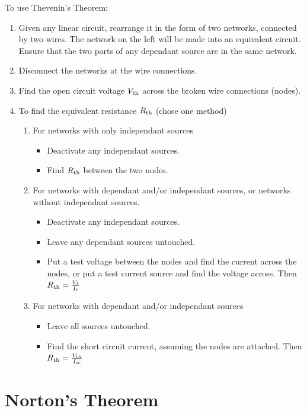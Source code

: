 \documentclass[12pt]{article}
\begin{document}
To use Thevenin's Theorem:
\begin{enumerate}
\item Given any linear circuit, rearrange it in the form of two networks, connected by two wires. The network on the left will be made into an equivalent circuit. Ensure that the two parts of any dependant source are in the same network.
\item Disconnect the networks at the wire connections.
\item Find the open circuit voltage $V_{{\rm th}}$ across the broken wire connections (nodes).
\item To find the equivalent resistance $R_{{\rm th}}$ (chose one method)
\begin{enumerate}
\item For networks with only independant sources
\begin{itemize}
\item Deactivate any independant sources.
\item Find $R_{{\rm th}}$ between the two nodes.
\end{itemize}
\item For networks with dependant and/or independant sources, or networks without independant sources.
\begin{itemize}
\item Deactivate any independant sources.
\item Leave any dependant sources untouched.
\item Put a test voltage between the nodes and find the current across the nodes, or put a test current source and find the voltage across. Then $R_{{\rm th}} = \frac{V_t}{I_t}$
\end{itemize}
\item For networks with dependant and/or independant sources
\begin{itemize}
\item Leave all sources untouched.
\item Find the short circuit current, assuming the nodes are attached. Then $R_{{\rm th}} = \frac{V_{{\rm th}}}{I_{{\rm sc}}}$
\end{itemize}
\end{enumerate}
\end{enumerate}

\section*{Norton's Theorem}
\end{document}
